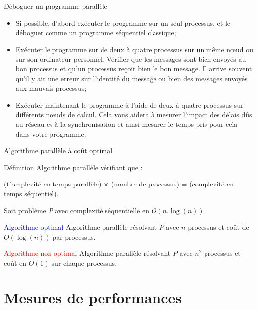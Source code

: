 \documentclass[handout]{beamer}
\begin{document}
\begin{frame}[fragile]{Déboguer un programme parallèle}

\begin{itemize}
 \item Si possible, d'abord exécuter le programme sur un seul processus, et le déboguer comme
 un programme séquentiel classique;
 \item Exécuter le programme sur de deux à quatre processus sur un même n{\oe}ud ou sur son ordinateur
 personnel. Vérifier que les messages sont bien envoyés au bon processus et qu'un processus reçoit bien
 le bon message. Il arrive souvent qu'il y ait une erreur sur l'identité du message ou bien des messages
 envoyés aux mauvais processus;
 \item Exécuter maintenant le programme à l'aide de deux à quatre processus sur différents
 n{\oe}uds de calcul. Cela vous aidera à mesurer l'impact des délais dûs au réseau et à la
 synchronisation et ainsi mesurer le temps pris pour cela dans votre programme.
\end{itemize}

\end{frame}

\begin{frame}[fragile]{Algorithme parallèle à coût optimal}

\begin{block}{Définition}
Algorithme parallèle vérifiant  que :

\begin{center}
 (Complexité en temps parallèle) $\times$ (nombre de processus) = (complexité en temps séquentiel).
\end{center}

\end{block}

\begin{example}
Soit problème $P$ avec complexité séquentielle en $O(n.\log(n))$.

\textcolor{blue}{Algorithme optimal}
Algorithme parallèle résolvant $P$ avec $n$ processus et coût de $O(\log(n))$ par processus.

\textcolor{red}{Algorithme non optimal}
Algorithme parallèle résolvant $P$ avec $n^{2}$ processus et coût en  $O(1)$ sur chaque processus.
\end{example}
\end{frame}

\section{Mesures de performances}
\end{document}
